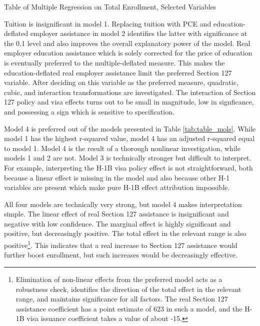 \documentclass[review]{elsarticle}
\begin{document}
    \begin{table}
        \caption{Table of Multiple Regression on Total Enrollment, Selected Variables}
        \resizebox{\columnwidth}{!}{
            
        }
        \label{tab:table_mols}
        \end{table}

    Tuition is insignificant in model 1.
    Replacing tuition with PCE and education-deflated employer assistance in model 2 identifies the latter
    with significance at the 0.1 level and also improves the overall explanatory power of the model.
    Real employer education assistance which is solely corrected for the price of education
    is eventually preferred to the multiple-deflated measure.
    This makes the education-deflated real employer assistance limit the preferred Section 127 variable.
    After deciding on this variable as the preferred measure,
    quadratic, cubic, and interaction transformations are investigated.
    The interaction of Section 127 policy and visa effects turns out to be small in magnitude,
    low in signficance,
    and possessing a sign which is sensitive to specification.

    Model 4 is preferred out of the models presented in Table \ref{tab:table_mols}.
    While model 1 has the highest r-squared value,
    model 4 has an adjusted r-squared equal to model 1.
    Model 4 is the result of a thorough nonlinear investigation,
    while models 1 and 2 are not.
    Model 3 is technically stronger but difficult to interpret.
    For example, interpreting the H-1B visa policy effect is not
    straightforward, both because a linear effect is missing in the model
    and also because other H-1 variables are present which make pure H-1B
    effect attribution impossible.

    All four models are technically very strong,
    but model 4 makes interpretation simple.
    The linear effect of real Section 127 assistance is insignificant and negative with low confidence.
    The marginal effect is highly significant and positive, but decreasingly positive.
    The total effect in the relevant range is also positive\footnote{
        Elimination of non-linear effects from the preferred model acts as a robustness check,
        identifies the direction of the total effect in the relevant range,
        and maintains significance for all factors.
        The real Section 127 assistance coefficient has a point estimate of 623 in such a model,
        and the H-1B visa issuance coefficient takes a value of about -15.
    }.
    This indicates that a real increase to Section 127 assistance would further boost enrollment,
    but such increases would be decreasingly effective.
\end{document}
